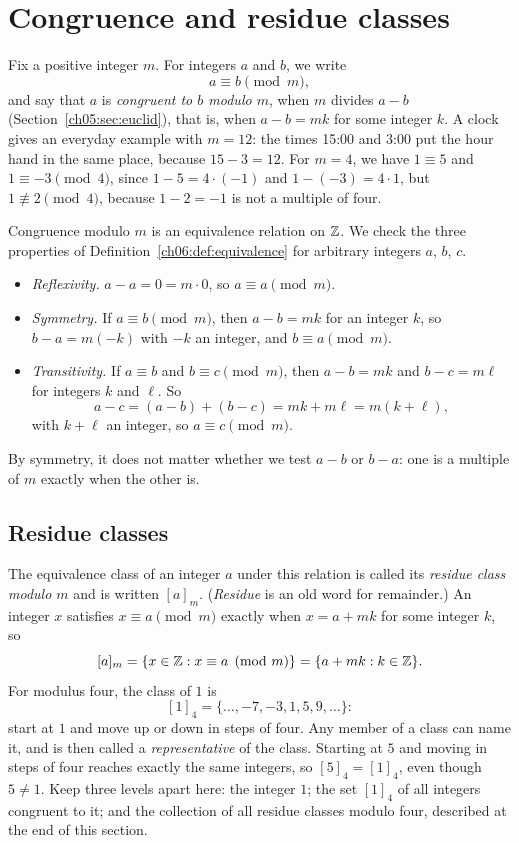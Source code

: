 \section{Congruence and residue classes}\label{ch06:sec:residues}
Fix a positive integer $m$. For integers $a$ and $b$, we write
\[
a\equiv b\pmod m,
\]
and say that $a$ is \emph{congruent to $b$ modulo $m$}, when $m$ divides $a-b$ (Section~\ref{ch05:sec:euclid}), that is, when $a-b=mk$ for some integer $k$. A clock gives an everyday example with $m=12$: the times 15:00 and 3:00 put the hour hand in the same place, because $15-3=12$. For $m=4$, we have $1\equiv5$ and $1\equiv-3\pmod4$, since $1-5=4\cdot(-1)$ and $1-(-3)=4\cdot1$, but $1\not\equiv2\pmod4$, because $1-2=-1$ is not a multiple of four.

Congruence modulo $m$ is an equivalence relation on $\mathbb Z$. We check the three properties of Definition~\ref{ch06:def:equivalence} for arbitrary integers $a$, $b$, $c$.
\begin{itemize}
\item \emph{Reflexivity.} $a-a=0=m\cdot0$, so $a\equiv a\pmod m$.
\item \emph{Symmetry.} If $a\equiv b\pmod m$, then $a-b=mk$ for an integer $k$, so $b-a=m(-k)$ with $-k$ an integer, and $b\equiv a\pmod m$.
\item \emph{Transitivity.} If $a\equiv b$ and $b\equiv c\pmod m$, then $a-b=mk$ and $b-c=m\ell$ for integers $k$ and $\ell$. So
\[
a-c=(a-b)+(b-c)=mk+m\ell=m(k+\ell),
\]
with $k+\ell$ an integer, so $a\equiv c\pmod m$.
\end{itemize}
By symmetry, it does not matter whether we test $a-b$ or $b-a$: one is a multiple of $m$ exactly when the other is.

\subsection*{Residue classes}
The equivalence class of an integer $a$ under this relation is called its \emph{residue class modulo $m$} and is written $[a]_m$. (\emph{Residue} is an old word for remainder.) An integer $x$ satisfies $x\equiv a\pmod m$ exactly when $x=a+mk$ for some integer $k$, so
\[
[a]_m=\{x\in\mathbb Z:x\equiv a\pmod m\}=\{a+mk:k\in\mathbb Z\}.
\]
For modulus four, the class of $1$ is
\[
[1]_4=\{\ldots,-7,-3,1,5,9,\ldots\}:
\]
start at $1$ and move up or down in steps of four. Any member of a class can name it, and is then called a \emph{representative} of the class. Starting at $5$ and moving in steps of four reaches exactly the same integers, so $[5]_4=[1]_4$, even though $5\ne1$. Keep three levels apart here: the integer $1$; the set $[1]_4$ of all integers congruent to it; and the collection of all residue classes modulo four, described at the end of this section.

